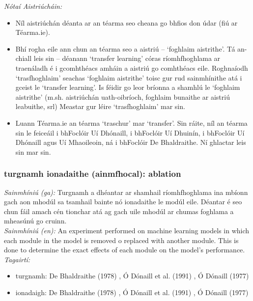  \noindent \textit{Nótaí Aistriúcháin:}
\begin{itemize}
	\item Níl aistriúchán déanta ar an téarma seo cheana go bhfios don údar (fiú ar Téarma.ie).
	\item Bhí rogha eile ann chun an téarma seo a aistriú -- `foghlaim aistrithe'. Tá an-chiall leis sin -- déanann `transfer learning' córas ríomhfhoghlama ar traenáladh é i gcomhthéacs amháin a aistriú go comhthéacs eile. Roghnaíodh `trasfhoghlaim' seachas `foghlaim aistrithe' toisc gur rud sainmhínithe atá i gceist le `transfer learning'. Is féidir go leor bríonna a shamhlú le `foghlaim aistrithe' (m.sh. aistriúchán uath-oibríoch, foghlaim bunaithe ar aistriú leabuithe, srl) Meastar gur léire `trasfhoghlaim' mar sin.
	\item Luann Téarma.ie an téarma `traschur' mar `transfer'. Sin ráite, níl an téarma sin le feiceáil i bhFoclóir Uí Dhónaill, i bhFoclóir Uí Dhuinín, i bhFoclóir Uí Dhónaill agus Uí Mhaoileoin, ná i bhFoclóir De Bhaldraithe. Ní ghlactar leis sin mar sin.
\end{itemize}


\subsubsection*{turgnamh ionadaithe (ainmfhocal): ablation}
 \noindent \textit{Sainmhíniú (ga):} Turgnamh a dhéantar ar shamhail ríomhfhoghlama ina mbíonn gach aon mhodúl sa tsamhail bainte nó ionadaithe le modúl eile. Déantar é seo chun fáil amach cén tionchar atá ag gach uile mhodúl ar chumas foghlama a mheasúnú go cruinn.
\\
 \noindent \textit{Sainmhíniú (en):} An experiment performed on machine learning models in which each module in the model is removed o replaced with another module. This is done to determine the exact effects of each module on the model's performance.
\\
 \noindent \textit{Tagairtí:}
\begin{itemize}
	\item turgnamh: De Bhaldraithe (1978) \cite{de-bhaldraithe}, Ó Dónaill et al. (1991) \cite{focloir-beag}, Ó Dónaill (1977) \cite{odonaill}
	\item ionadaigh: De Bhaldraithe (1978) \cite{de-bhaldraithe}, Ó Dónaill et al. (1991) \cite{focloir-beag}, Ó Dónaill (1977) \cite{odonaill}
\end{itemize}

